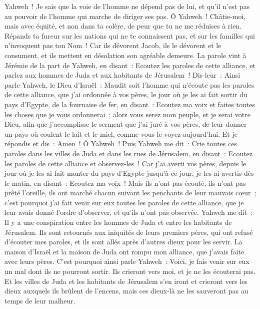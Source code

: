 \begin{multicols}{2}
Yahweh~! Je sais que la voie de l'homme ne dépend pas de lui, et qu'il n'est pas au pouvoir de l'homme qui marche de diriger ses pas.
Ô Yahweh~! Châtie-moi, mais avec équité, et non dans ta colère, de peur que tu ne me réduises à rien.
Répands ta fureur sur les nations qui ne te connaissent pas, et sur les familles qui n'invoquent pas ton Nom~! Car ils dévorent Jacob, ils le dévorent et le consument, et ils mettent en désolation son agréable demeure.
\VerseOne{}La parole vint à Jérémie de la part de Yahweh, en disant~:
Ecoutez les paroles de cette alliance, et parlez aux hommes de Juda et aux habitants de Jérusalem~!
Dis-leur~: Ainsi parle Yahweh, le Dieu d'Israël~: Maudit soit l'homme qui n'écoute pas les paroles de cette alliance,
que j'ai ordonnée à vos pères, le jour où je les ai fait sortir du pays d'Egypte, de la fournaise de fer, en disant~: Ecoutez ma voix et faites toutes les choses que je vous ordonnerai~; alors vous serez mon peuple, et je serai votre Dieu,
afin que j'accomplisse le serment que j'ai juré à vos pères, de leur donner un pays où coulent le lait et le miel, comme vous le voyez aujourd'hui. Et je répondis et dis~: Amen~! Ô Yahweh~!
Puis Yahweh me dit~: Crie toutes ces paroles dans les villes de Juda et dans les rues de Jérusalem, en disant~: Ecoutez les paroles de cette alliance et observez-les~!
Car j'ai averti vos pères, depuis le jour où je les ai fait monter du pays d'Egypte jusqu'à ce jour, je les ai avertis dès le matin, en disant~: Ecoutez ma voix~!
Mais ils n'ont pas écouté, ils n'ont pas prêté l'oreille, ils ont marché chacun suivant les penchants de leur mauvais cœur~; c'est pourquoi j'ai fait venir sur eux toutes les paroles de cette alliance, que je leur avais donné l'ordre d'observer, et qu'ils n'ont pas observée.
Yahweh me dit~: Il y a une conspiration entre les hommes de Juda et entre les habitants de Jérusalem.
Ils sont retournés aux iniquités de leurs premiers pères, qui ont refusé d'écouter mes paroles, et ils sont allés après d'autres dieux pour les servir. La maison d'Israël et la maison de Juda ont rompu mon alliance, que j'avais faite avec leurs pères.
C'est pourquoi ainsi parle Yahweh~: Voici, je fais venir sur eux un mal dont ils ne pourront sortir. Ils crieront vers moi, et je ne les écouterai pas.
Et les villes de Juda et les habitants de Jérusalem s'en iront et crieront vers les dieux auxquels ils brûlent de l'encens, mais ces dieux-là ne les sauveront pas au temps de leur malheur.

\end{multicols}

